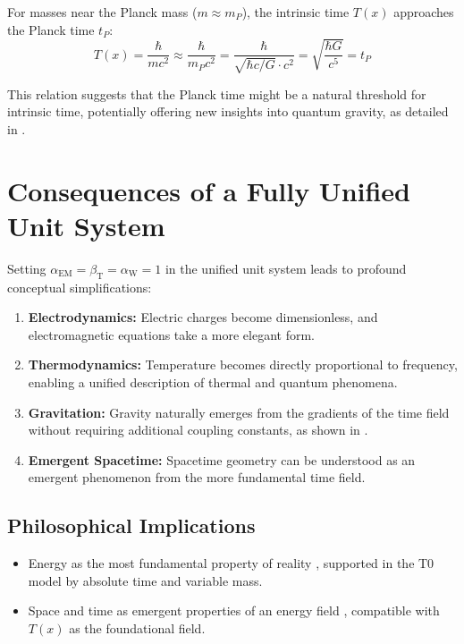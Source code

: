 \documentclass[12pt,a4paper]{article}
\newcommand{\Tfield}{T(x)}
\newcommand{\betaT}{\beta_{\text{T}}}
\newcommand{\alphaEM}{\alpha_{\text{EM}}}
\newcommand{\alphaW}{\alpha_{\text{W}}}
\begin{document}
	For masses near the Planck mass (\(m \approx m_P\)), the intrinsic time \(\Tfield\) approaches the Planck time \(t_P\):
	\begin{equation}
		\Tfield = \frac{\hbar}{m c^2} \approx \frac{\hbar}{m_P c^2} = \frac{\hbar}{\sqrt{\hbar c/G} \cdot c^2} = \sqrt{\frac{\hbar G}{c^5}} = t_P
	\end{equation}
	
	This relation suggests that the Planck time might be a natural threshold for intrinsic time, potentially offering new insights into quantum gravity, as detailed in \cite{pascher_planck_2025}.
	
	\section{Consequences of a Fully Unified Unit System}
	\label{sec:fully_unified}
	
	Setting \(\alphaEM = \betaT = \alphaW = 1\) in the unified unit system leads to profound conceptual simplifications:
	
	\begin{enumerate}
		\item \textbf{Electrodynamics:} Electric charges become dimensionless, and electromagnetic equations take a more elegant form.
		\item \textbf{Thermodynamics:} Temperature becomes directly proportional to frequency, enabling a unified description of thermal and quantum phenomena.
		\item \textbf{Gravitation:} Gravity naturally emerges from the gradients of the time field without requiring additional coupling constants, as shown in \cite{pascher_emergente_gravitation_2025}.
		\item \textbf{Emergent Spacetime:} Spacetime geometry can be understood as an emergent phenomenon from the more fundamental time field.
	\end{enumerate}
	
	\subsection{Philosophical Implications}
	\label{subsec:philosophical}
	
	\begin{itemize}
		\item Energy as the most fundamental property of reality \cite{Wilczek2008}, supported in the T0 model by absolute time and variable mass.
		\item Space and time as emergent properties of an energy field \cite{Verlinde2011}, compatible with \(\Tfield\) as the foundational field.
	\end{itemize}
	
\end{document}
